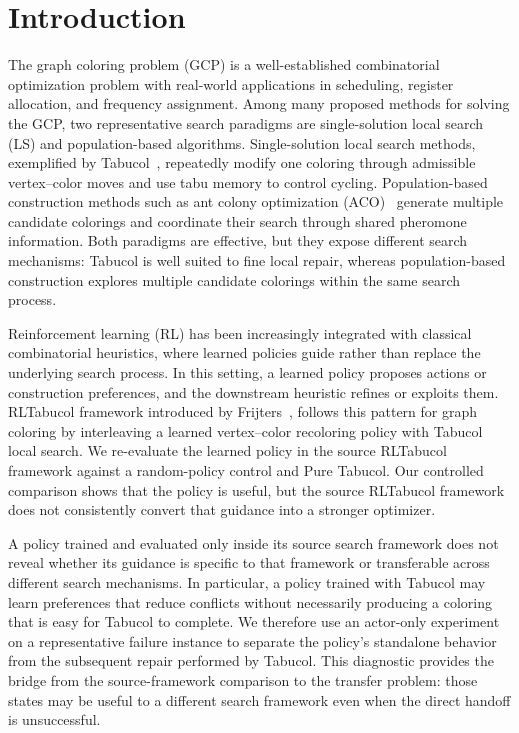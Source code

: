 \section{Introduction}
\label{sec:introduction}

The graph coloring problem (GCP) is a well-established combinatorial optimization problem with real-world applications in scheduling, register allocation, and frequency assignment.  Among many proposed methods for solving the GCP, two representative search paradigms are single-solution local search (LS) and population-based algorithms. Single-solution local search methods, exemplified by Tabucol~\cite{hertz1987tabu}, repeatedly modify one coloring through admissible vertex--color moves and use tabu memory to control cycling. Population-based construction methods such as ant colony optimization (ACO)~\cite{costa1997ants} generate multiple candidate colorings and coordinate their search through shared pheromone information. Both paradigms are effective, but they expose different search mechanisms: Tabucol is well suited to fine local repair, whereas population-based construction explores multiple candidate colorings within the same search process.

Reinforcement learning (RL) has been increasingly integrated with classical combinatorial heuristics, where learned policies guide rather than replace the underlying search process. In this setting, a learned policy proposes actions or construction preferences, and the downstream heuristic refines or exploits them. RLTabucol framework introduced by Frijters~\cite{frijters2023rltabucol}, follows this pattern for graph coloring by interleaving a learned vertex--color recoloring policy with Tabucol local search. We re-evaluate the learned policy in the source RLTabucol framework against a random-policy control and Pure Tabucol. Our controlled comparison shows that the policy is useful, but the source RLTabucol framework does not consistently convert that guidance into a stronger optimizer. 

A policy trained and evaluated only inside its source search framework does not reveal whether its guidance is specific to that framework or transferable across different search mechanisms. In particular, a policy trained with Tabucol may learn preferences that reduce conflicts without necessarily producing a coloring that is easy for Tabucol to complete. We therefore use an actor-only experiment on a representative failure instance to separate the policy's standalone behavior from the subsequent repair performed by Tabucol. This diagnostic provides the bridge from the source-framework comparison to the transfer problem: those states may be useful to a different search framework even when the direct handoff is unsuccessful.

